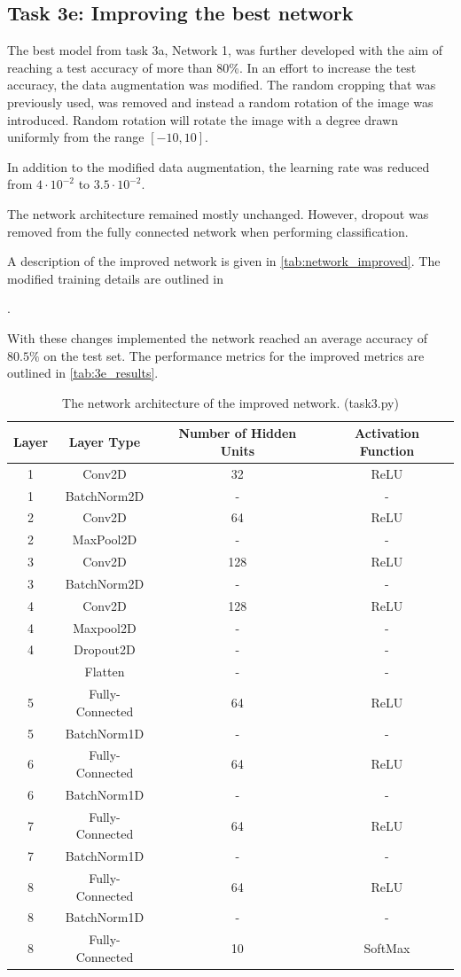 \documentclass{article}
\begin{document}
\subsection{Task 3e: Improving the best network}

The best model from task 3a, Network 1, was further developed with the aim of reaching a test accuracy of more than 80\%. In an effort to increase the test accuracy, the data augmentation was modified. The random cropping that was previously used, was removed and instead a random rotation of the image was introduced. Random rotation will rotate the image with a degree drawn uniformly from the range $[-10, 10]$.

In addition to the modified data augmentation, the learning rate was reduced from $4\cdot 10^{-2}$ to $3.5 \cdot 10^{-2}$.

The network architecture remained mostly unchanged. However, dropout was removed from the fully connected network when performing classification.

A description of the improved network is given in \autoref{tab:network_improved}. The modified training details are outlined in \author{tab:netimprovedtrainparam}.

With these changes implemented the network reached an average accuracy of$80.5\%$ on the test set. The performance metrics for the improved metrics are outlined in \autoref{tab:3e_results}.

\begin{table}[H]
\centering
\caption{The network architecture of the improved network. (task3.py)}
\label{tab:network_improved}
\begin{tabular}{c|c|c|c}
\textbf{Layer} & \textbf{Layer Type} & \textbf{Number of Hidden Units} & \textbf{Activation Function} \\ \hline
1 & Conv2D & 32 & ReLU \\
1 & BatchNorm2D & - & - \\
2 & Conv2D & 64 & ReLU \\
2 & MaxPool2D & - & - \\
3 & Conv2D & 128 & ReLU \\
3 & BatchNorm2D & - & - \\
4 & Conv2D & 128 & ReLU \\
4 & Maxpool2D & - & - \\
4 & Dropout2D & - & - \\\hline

 & Flatten & - & - \\
5 & Fully-Connected & 64 & ReLU \\
5 & BatchNorm1D & - & - \\
6 & Fully-Connected & 64 & ReLU \\
6 & BatchNorm1D & - & - \\
7 & Fully-Connected & 64 & ReLU \\
7 & BatchNorm1D & - & - \\
8 & Fully-Connected & 64 & ReLU \\
8 & BatchNorm1D & - & - \\
8 & Fully-Connected & 10 & SoftMax \\
\end{tabular}
\end{table}
\end{document}
